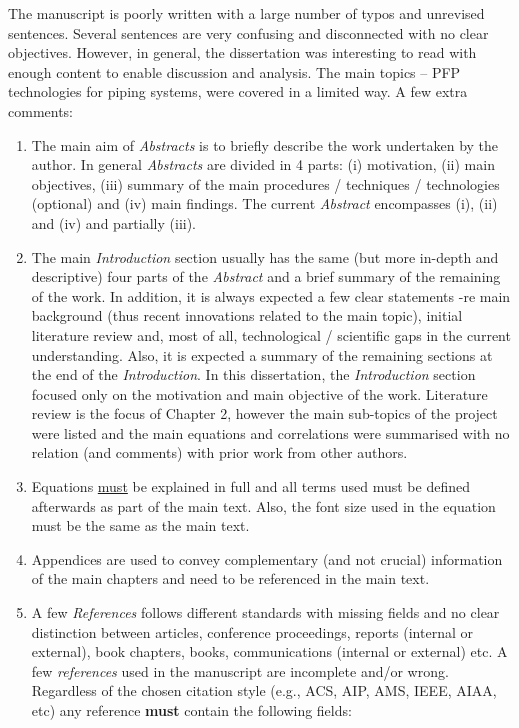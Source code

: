 \documentclass[14pt,twoside]{report}
\begin{document}
The manuscript is poorly written with a large number of typos and unrevised sentences. Several sentences are very confusing and disconnected with no clear objectives. However, in general, the dissertation was interesting to read with enough content to enable discussion and analysis. The main topics -- PFP technologies for piping systems,  were covered in a limited way. A few extra comments:
\begin{enumerate}
\item The main aim of {\it Abstracts} is to briefly describe the work undertaken by the author. In general {\it Abstracts} are divided in 4 parts: (i) motivation, (ii) main objectives, (iii) summary of the main procedures / techniques / technologies (optional) and (iv) main findings. The current {\it Abstract} encompasses (i), (ii) and (iv) and partially (iii).
%
\item The main {\it Introduction} section usually has the same (but more in-depth and descriptive) four parts of the {\it Abstract} and a brief summary of the remaining of the work. In addition, it is always expected a few clear statements -re main background (thus recent innovations related to the main topic), initial literature review and, most of all, technological / scientific gaps in the current understanding. Also, it is expected a summary of the remaining sections at the end of the {\it Introduction}. In this dissertation, the {\it Introduction} section focused only on the motivation and main objective of the work. Literature review is the focus of Chapter 2, however the main sub-topics of the project were listed and the main equations and correlations were summarised with no relation (and comments) with prior work from other authors. 
%
\item Equations \underline{must} be explained in full and all terms used must be defined afterwards as part of the main text. Also, the font size used in the equation must be the same as the main text.  
%
\item Appendices are used to convey complementary (and not crucial) information of the main chapters and need to be referenced in the main text.
%
\item A few {\it References} follows different standards with missing fields and no clear distinction between articles, conference proceedings, reports (internal or external), book chapters, books, communications (internal or external) etc.  A few {\it references} used in the manuscript are incomplete and/or wrong. Regardless of the chosen citation style (e.g., ACS, AIP, AMS, IEEE, AIAA, etc) any reference {\bf must} contain the following fields: 

\end{enumerate}
\end{document}

